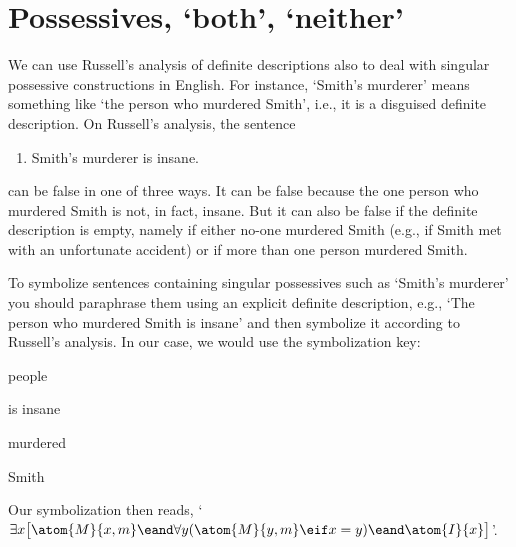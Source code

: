 \section{Possessives, `both', `neither'}

We can use Russell's analysis of definite descriptions also to deal with singular possessive constructions in English.  For instance, `Smith's murderer' means something like `the person who murdered Smith', i.e., it is a disguised definite description.  On Russell's analysis, the sentence
\begin{enumerate}
	\item\label{smithsmurder} Smith's murderer is insane.
\end{enumerate}
can be false in one of three ways. It can be false because the one person who murdered Smith is not, in fact, insane. But it can also be false if the definite description is empty, namely if either no-one murdered Smith (e.g., if Smith met with an unfortunate accident) or if more than one person murdered Smith.

To symbolize sentences containing singular possessives such as `Smith's murderer' you should paraphrase them using an explicit definite description, e.g., `The person who murdered Smith is insane' and then symbolize it according to Russell's analysis. In our case, we would use the symbolization key:
\begin{ekey}
	\item[$Domain$] people
	\item[\atom{I}{x}]  is insane 
	\item[\atom{M}{x,y}]  murdered 
	\item[m] Smith 
\end{ekey}
Our symbolization then reads, `$\exists x\bigl[\atom{M}{x,m} \eand \forall y(\atom{M}{y,m} \eif x=y) \eand \atom{I}{x}\bigr]$'.

